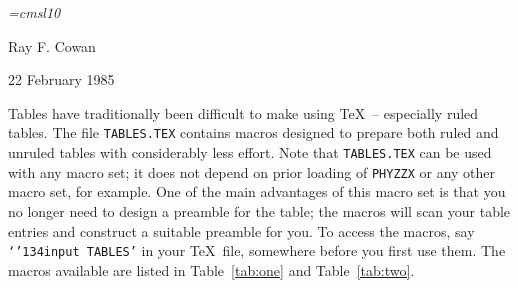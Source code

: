 %
\def\bs{\char'134}
\def\vbar{\char'174}
\def\and{\char'046}
\def\tc#1{\hbox{\tt \bs #1}}
\def\ctr#1{\quad #1 \hfil}
\font\sl=cmsl10
\setlength{\textwidth}{433pt}
\setlength{\oddsidemargin}{0pt}
\setlength{\marginparwidth}{72pt}
\setlength{\topmargin}{0pt}
\setlength{\textheight}{555pt}
%

\centerline{}
\vbox{\vskip 0.5in}
\centerline{Ray F. Cowan}
\centerline{22 February 1985}
\vbox{\vskip 0.5in}
Tables have traditionally been difficult to make using \TeX\ -- especially
ruled tables.  The file {\tt \hbox{TABLES.TEX}} contains macros designed to
prepare both ruled and unruled tables with considerably less effort.  Note that
\hbox{\tt TABLES.TEX} can be used with any macro set; it does not depend on
prior loading of \hbox{\tt PHYZZX} or any other macro set, for example. One of
the main advantages of this macro set is that you no longer need to design a
preamble for the table; the macros will scan your table entries and construct a
suitable preamble for you.  To access the macros, say \hbox{\tt `\bs input
TABLES'} in your \TeX\ file, somewhere before you first use them.  The macros
available are listed in Table~\ref{tab:one} and Table~\ref{tab:two}.

